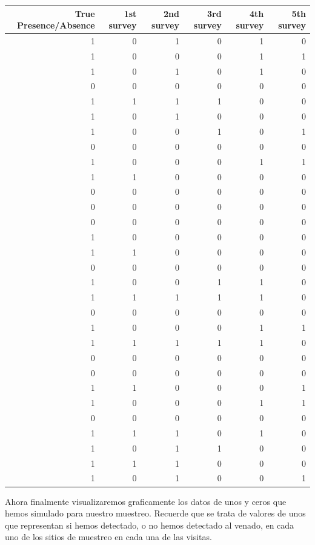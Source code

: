 \documentclass[]{book}
\begin{document}
\begin{tabular}{r|r|r|r|r|r}
\hline
True Presence/Absence & 1st survey & 2nd survey & 3rd survey & 4th survey & 5th survey\\
\hline
1 & 0 & 1 & 0 & 1 & 0\\
\hline
1 & 0 & 0 & 0 & 1 & 1\\
\hline
1 & 0 & 1 & 0 & 1 & 0\\
\hline
0 & 0 & 0 & 0 & 0 & 0\\
\hline
1 & 1 & 1 & 1 & 0 & 0\\
\hline
1 & 0 & 1 & 0 & 0 & 0\\
\hline
1 & 0 & 0 & 1 & 0 & 1\\
\hline
0 & 0 & 0 & 0 & 0 & 0\\
\hline
1 & 0 & 0 & 0 & 1 & 1\\
\hline
1 & 1 & 0 & 0 & 0 & 0\\
\hline
0 & 0 & 0 & 0 & 0 & 0\\
\hline
0 & 0 & 0 & 0 & 0 & 0\\
\hline
0 & 0 & 0 & 0 & 0 & 0\\
\hline
1 & 0 & 0 & 0 & 0 & 0\\
\hline
1 & 1 & 0 & 0 & 0 & 0\\
\hline
0 & 0 & 0 & 0 & 0 & 0\\
\hline
1 & 0 & 0 & 1 & 1 & 0\\
\hline
1 & 1 & 1 & 1 & 1 & 0\\
\hline
0 & 0 & 0 & 0 & 0 & 0\\
\hline
1 & 0 & 0 & 0 & 1 & 1\\
\hline
1 & 1 & 1 & 1 & 1 & 0\\
\hline
0 & 0 & 0 & 0 & 0 & 0\\
\hline
0 & 0 & 0 & 0 & 0 & 0\\
\hline
1 & 1 & 0 & 0 & 0 & 1\\
\hline
1 & 0 & 0 & 0 & 1 & 1\\
\hline
0 & 0 & 0 & 0 & 0 & 0\\
\hline
1 & 1 & 1 & 0 & 1 & 0\\
\hline
1 & 0 & 1 & 1 & 0 & 0\\
\hline
1 & 1 & 1 & 0 & 0 & 0\\
\hline
1 & 0 & 1 & 0 & 0 & 1\\
\hline
\end{tabular}

Ahora finalmente visualizaremos graficamente los datos de unos y ceros
que hemos simulado para nuestro muestreo. Recuerde que se trata de
valores de unos que representan si hemos detectado, o no hemos detectado
al venado, en cada uno de los sitios de muestreo en cada una de las
visitas.
\end{document}
